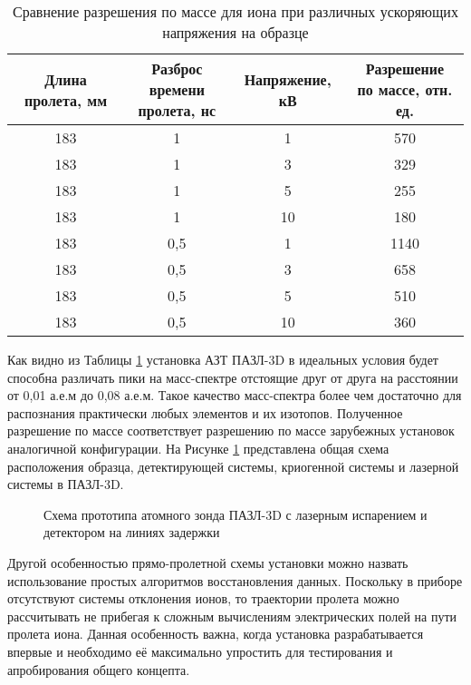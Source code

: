 \begin{table} [htbp]
	\centering
	\caption{Сравнение разрешения по массе для иона при различных ускоряющих напряжения на образце}
	\label{tab:calcFWHM}
	\begin{SingleSpace}
		\begin{tabular} {| c | c | c | c |}
			\hline
			Длина пролета, мм & \thead{Разброс времени\\ пролета, нс} & Напряжение, кВ & \thead{Разрешение \\по массе, отн. ед.}  \\ \hline
			183 & 1 & 1  &  570               \\ \hline
			183 & 1 & 3  &  329               \\ \hline
			183 & 1 & 5  &  255               \\ \hline
			183 & 1 & 10 &  180               \\ \hline
			183 & 0,5 & 1  &  1140               \\ \hline
			183 & 0,5 & 3  &  658               \\ \hline
			183 & 0,5 & 5  &  510               \\ \hline
			183 & 0,5 & 10 &  360               \\ \hline
		\end{tabular}
	\end{SingleSpace}
\end{table}

Как видно из Таблицы \cref{tab:calcFWHM} установка АЗТ ПАЗЛ-3D в идеальных условия будет способна различать пики на масс-спектре отстоящие друг от друга на расстоянии от 0,01 а.е.м до 0,08 а.е.м. Такое качество масс-спектра более чем достаточно для распознания практически любых элементов и их изотопов. Полученное разрешение по массе соответствует разрешению по массе зарубежных установок аналогичной конфигурации.
На Рисунке \cref{fig:main_scheme} представлена общая схема расположения образца, детектирующей системы, криогенной системы и лазерной системы в ПАЗЛ-3D.
\begin{figure}[htb]
	\caption{Схема прототипа атомного зонда ПАЗЛ-3D с лазерным испарением и детектором на линиях задержки}
	\label{fig:main_scheme}
\end{figure}
  
Другой особенностью прямо-пролетной схемы установки можно назвать использование простых алгоритмов восстановления данных. Поскольку в приборе отсутствуют системы отклонения ионов, то траектории пролета можно рассчитывать не прибегая к сложным вычислениям электрических полей на пути пролета иона. Данная особенность важна, когда установка разрабатывается впервые и необходимо её максимально упростить для тестирования и апробирования общего концепта.

